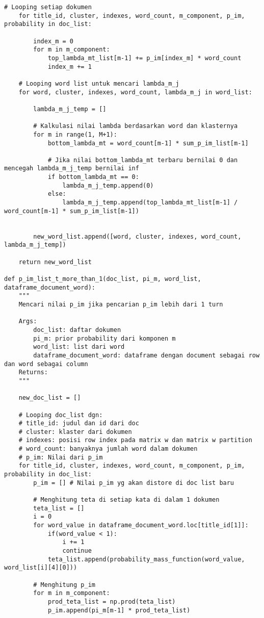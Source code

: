 \begin{lstlisting}[breaklines=true]
	# Looping setiap dokumen
	for title_id, cluster, indexes, word_count, m_component, p_im, probability in doc_list:
			
		index_m = 0
		for m in m_component:
			top_lambda_mt_list[m-1] += p_im[index_m] * word_count
			index_m += 1
	
	# Looping word list untuk mencari lambda_m_j
	for word, cluster, indexes, word_count, lambda_m_j in word_list:
			
		lambda_m_j_temp = []
		
		# Kalkulasi nilai lambda berdasarkan word dan klasternya
		for m in range(1, M+1):
			bottom_lambda_mt = word_count[m-1] * sum_p_im_list[m-1]
			
			# Jika nilai bottom_lambda_mt terbaru bernilai 0 dan mencegah lambda_m_j_temp bernilai inf
			if bottom_lambda_mt == 0:
				lambda_m_j_temp.append(0)
			else:
				lambda_m_j_temp.append(top_lambda_mt_list[m-1] / word_count[m-1] * sum_p_im_list[m-1])
				
		
		new_word_list.append([word, cluster, indexes, word_count, lambda_m_j_temp])
	
	return new_word_list

def p_im_list_t_more_than_1(doc_list, pi_m, word_list, dataframe_document_word):
	"""
	Mencari nilai p_im jika pencarian p_im lebih dari 1 turn

	Args:
		doc_list: daftar dokumen
		pi_m: prior probability dari komponen m
		word_list: list dari word
		dataframe_document_word: dataframe dengan document sebagai row dan word sebagai column
	Returns:
	"""
	
	new_doc_list = []
	
	# Looping doc_list dgn:
	# title_id: judul dan id dari doc
	# cluster: klaster dari dokumen
	# indexes: posisi row index pada matrix w dan matrix w partition
	# word_count: banyaknya jumlah word dalam dokumen
	# p_im: Nilai dari p_im
	for title_id, cluster, indexes, word_count, m_component, p_im, probability in doc_list:
		p_im = [] # Nilai p_im yg akan distore di doc list baru
		
		# Menghitung teta di setiap kata di dalam 1 dokumen
		teta_list = []
		i = 0
		for word_value in dataframe_document_word.loc[title_id[1]]:
			if(word_value < 1):
				i += 1
				continue
			teta_list.append(probability_mass_function(word_value, word_list[i][4][0]))
		
		# Menghitung p_im
		for m in m_component:
			prod_teta_list = np.prod(teta_list)
			p_im.append(pi_m[m-1] * prod_teta_list)
				

\end{lstlisting}
